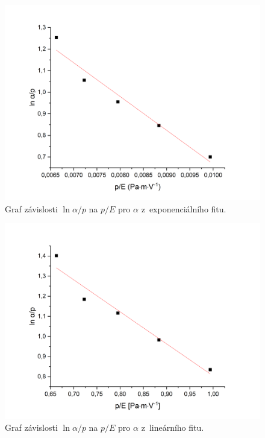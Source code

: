 \documentclass[a4paper,12pt]{article}
\begin{document}
 \begin{figure}[h]
 	\centering
 	\includegraphics[width=145mm]{exp.png}
 	\caption{Graf závislosti $\ln \alpha/p$ na $p/E$ pro $\alpha$ 
 	z~exponenciálního fitu.}
 	\label{exp}
 \end{figure}

 \begin{figure}[h]
	\centering
	\includegraphics[width=145mm]{lin.png}
	\caption{Graf závislosti $\ln \alpha/p$ na $p/E$ pro $\alpha$ z~lineárního 
	fitu.}
	\label{lin}
\end{figure}
 
\end{document}
